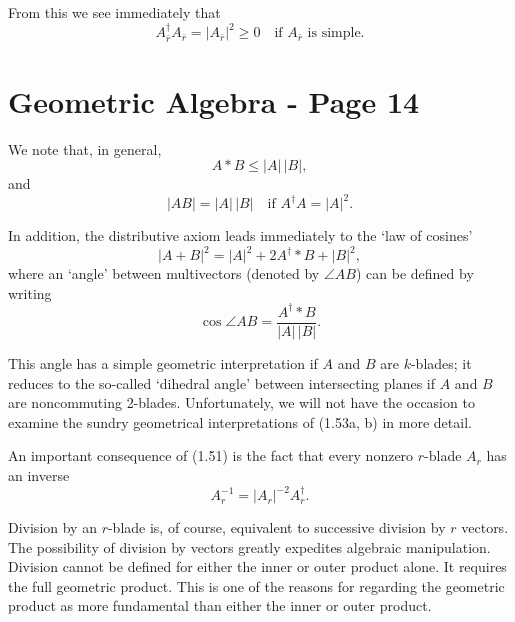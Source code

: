 \documentclass[fleqn]{scrartcl}
\numberwithin{equation}{section}
\begin{document}
\noindent From this we see immediately that
\begin{equation}
A_{\bar{r}}^{\dagger} A_{\bar{r}} = |A_{\bar{r}}|^2 \geq 0 \quad \text{if } A_{\bar{r}} \text{ is simple}. \tag{1.51}
\end{equation}

\section*{Geometric Algebra - Page 14}

\noindent We note that, in general,
\begin{equation}
A * B \leq |A| \, |B|, \tag{1.52a}
\end{equation}
and
\begin{equation}
|AB| = |A| \, |B| \quad \text{if } A^{\dagger} A = |A|^2. \tag{1.52b}
\end{equation}

\noindent In addition, the distributive axiom leads immediately to the `law of cosines'
\begin{equation}
|A + B|^2 = |A|^2 + 2 A^{\dagger} * B + |B|^2, \tag{1.53a}
\end{equation}
where an `angle' between multivectors (denoted by \(\angle AB\)) can be defined by writing
\begin{equation}
\cos \angle AB = \frac{A^{\dagger} * B}{|A| \, |B|}. \tag{1.53b}
\end{equation}

\noindent This angle has a simple geometric interpretation if \(A\) and \(B\) are \(k\)-blades; it reduces to the so-called `dihedral angle' between intersecting planes if \(A\) and \(B\) are noncommuting 2-blades. Unfortunately, we will not have the occasion to examine the sundry geometrical interpretations of (1.53a, b) in more detail.

\vspace{1em}
\noindent An important consequence of (1.51) is the fact that every nonzero \(r\)-blade \(A_r\) has an inverse
\begin{equation}
A_r^{-1} = |A_r|^{-2} A_r^{\dagger}. \tag{1.54}
\end{equation}

\noindent Division by an \(r\)-blade is, of course, equivalent to successive division by \(r\) vectors. The possibility of division by vectors greatly expedites algebraic manipulation. Division cannot be defined for either the inner or outer product alone. It requires the full geometric product. This is one of the reasons for regarding the geometric product as more fundamental than either the inner or outer product.
\end{document}
